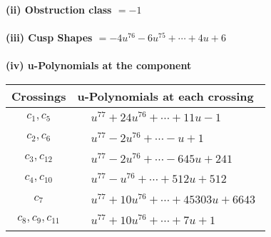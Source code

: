 \documentclass[1p]{elsarticle_modified}
\theoremstyle{definition}
\begin{document}
\flushleft \textbf{(ii) Obstruction class $= -1$}\\~\\
\flushleft \textbf{(iii) Cusp Shapes $= -4 u^{76}-6 u^{75}+\cdots+4 u+6$}\\~\\
\newpage\renewcommand{\arraystretch}{1}
\flushleft \textbf{(iv) u-Polynomials at the component}\newline \\
\begin{tabular}{m{50pt}|m{274pt}}
Crossings & \hspace{64pt}u-Polynomials at each crossing \\
\hline $$\begin{aligned}c_{1},c_{5}\end{aligned}$$&$\begin{aligned}
&u^{77}+24 u^{76}+\cdots+11 u-1
\end{aligned}$\\
\hline $$\begin{aligned}c_{2},c_{6}\end{aligned}$$&$\begin{aligned}
&u^{77}-2 u^{76}+\cdots- u+1
\end{aligned}$\\
\hline $$\begin{aligned}c_{3},c_{12}\end{aligned}$$&$\begin{aligned}
&u^{77}-2 u^{76}+\cdots-645 u+241
\end{aligned}$\\
\hline $$\begin{aligned}c_{4},c_{10}\end{aligned}$$&$\begin{aligned}
&u^{77}- u^{76}+\cdots+512 u+512
\end{aligned}$\\
\hline $$\begin{aligned}c_{7}\end{aligned}$$&$\begin{aligned}
&u^{77}+10 u^{76}+\cdots+45303 u+6643
\end{aligned}$\\
\hline $$\begin{aligned}c_{8},c_{9},c_{11}\end{aligned}$$&$\begin{aligned}
&u^{77}+10 u^{76}+\cdots+7 u+1
\end{aligned}$\\
\hline
\end{tabular}\\~\\
\end{document}
